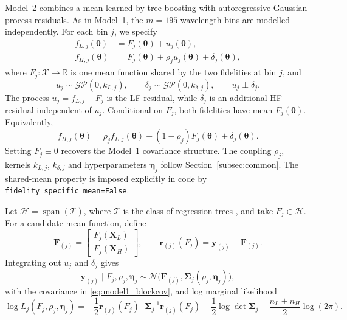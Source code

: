 \documentclass[12pt, letterpaper, oneside]{article}
\begin{document}
Model~2 combines a mean learned by tree boosting with autoregressive Gaussian
process residuals. As in Model~1, the $m=195$ wavelength bins are modelled
independently. For each bin $j$, we specify
\begin{align}
    f_{L,j}(\bm\theta)
    &= F_j(\bm\theta)+u_j(\bm\theta),
       \label{eq:model2-lf} \\
    f_{H,j}(\bm\theta)
    &= F_j(\bm\theta)+\rho_j u_j(\bm\theta)
       +\delta_j(\bm\theta),
       \label{eq:model2-hf}
\end{align}
where $F_j:\mathcal{X}\to\mathbb{R}$ is one mean function shared by the two
fidelities at bin $j$, and
\begin{equation}
    u_j\sim\mathcal{GP}(0,k_{L,j}),
    \qquad
    \delta_j\sim\mathcal{GP}(0,k_{\delta,j}),
    \qquad
    u_j\perp\delta_j.
    \label{eq:model2-gps}
\end{equation}
The process $u_j=f_{L,j}-F_j$ is the LF residual, while $\delta_j$
is an additional HF residual independent of $u_j$.
Conditional on $F_j$, both fidelities have mean $F_j(\bm\theta)$.
Equivalently,
\begin{equation}
    f_{H,j}(\bm\theta)
    = \rho_j f_{L,j}(\bm\theta)
      +(1-\rho_j)F_j(\bm\theta)+\delta_j(\bm\theta).
    \label{eq:model2-ar}
\end{equation}
Setting $F_j\equiv0$ recovers the Model~1 covariance structure. The coupling
$\rho_j$, kernels $k_{L,j}$, $k_{\delta,j}$ and hyperparameters $\bm\eta_j$
follow Section~\ref{subsec:common}. The shared-mean property is imposed
explicitly in code by \texttt{fidelity\_specific\_mean=False}.

Let $\mathcal{H}=\operatorname{span}(\mathcal{T})$, where $\mathcal{T}$ is the
class of regression trees \citep{Breiman1984}, and take $F_j\in\mathcal{H}$.
For a candidate mean function, define
\begin{equation}
    \mathbf{F}_{(j)}
    = \begin{bmatrix}
        F_j(\mathbf{X}_L) \\
        F_j(\mathbf{X}_H)
      \end{bmatrix},
    \qquad
    \mathbf{r}_{(j)}(F_j)
    = \mathbf{y}_{(j)}-\mathbf{F}_{(j)}.
    \label{eq:model2-residuals}
\end{equation}
Integrating out $u_j$ and $\delta_j$ gives
\begin{equation}
    \mathbf{y}_{(j)}\mid F_j,\rho_j,\bm\eta_j
    \sim\mathcal{N}\bigl(
        \mathbf{F}_{(j)},\bm\Sigma_j(\rho_j,\bm\eta_j)\bigr),
    \label{eq:model2-training}
\end{equation}
with the covariance in \eqref{eq:model1_blockcov}, and log marginal likelihood
\begin{equation}
    \log L_j(F_j,\rho_j,\bm\eta_j)
    = -\frac{1}{2}\mathbf{r}_{(j)}(F_j)^\top
        \bm\Sigma_j^{-1}\mathbf{r}_{(j)}(F_j)
      -\frac{1}{2}\log\det\bm\Sigma_j
      -\frac{n_L+n_H}{2}\log(2\pi).
    \label{eq:model2-lml}
\end{equation}
\end{document}
